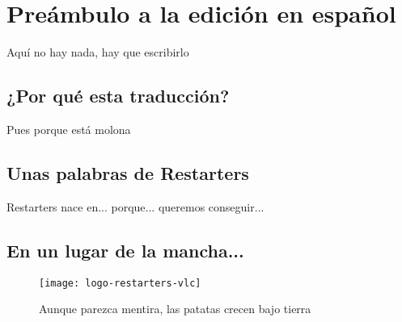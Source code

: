 \chapter{Preámbulo a la edición en español}
Aquí no hay nada, hay que escribirlo
\section{¿Por qué esta traducción?}
Pues porque está molona
\section{Unas palabras de Restarters}
Restarters nace en... porque... queremos conseguir...
\section{En un lugar de la mancha...}

\begin{figure}[h]
\centering
\texttt{[image: logo-restarters-vlc]} 
\caption*{Aunque parezca mentira, las patatas crecen bajo tierra}

\end{figure}

\newpage